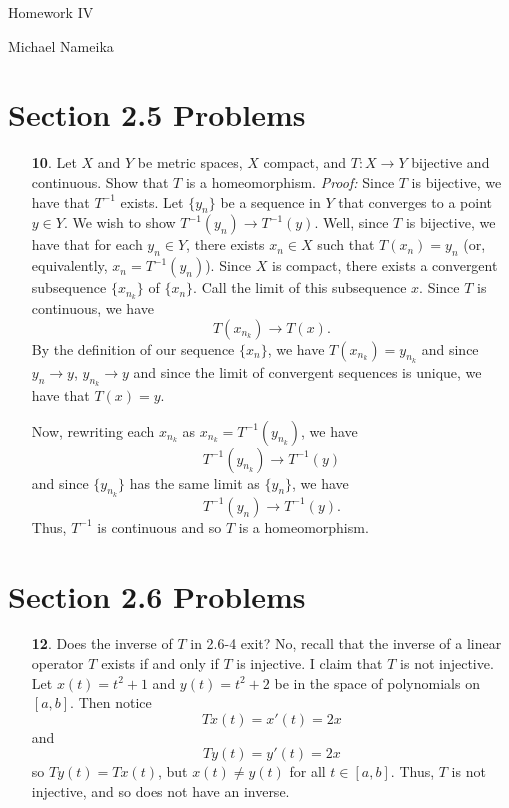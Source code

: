 \documentclass{article}
\begin{document}
\begin{center}
    {\Large Homework IV}
    \vspace{0.5 cm}

    {\large Michael Nameika}
\end{center}

\section*{Section 2.5 Problems}
\begin{itemize}
    \item[\textbf{10}.] Let $X$ and $Y$ be metric spaces, $X$ compact, and $T: X \to Y$ bijective and continuous. Show that $T$ is a homeomorphism.
    \newline\newline
    \textit{Proof:} Since $T$ is bijective, we have that $T^{-1}$ exists. Let $\{y_n\}$ be a sequence in $Y$ that converges to a point $y \in Y$. We wish to show $T^{-1}(y_n) \to T^{-1}(y)$. Well, since $T$ is bijective, we have that for each $y_n \in Y$, there exists $x_n \in X$ such that $T(x_n) = y_n$ (or, equivalently, $x_n = T^{-1}(y_n)$). Since $X$ is compact, there exists a convergent subsequence $\{x_{n_k}\}$ of $\{x_n\}$. Call the limit of this subsequence $x$. Since $T$ is continuous, we have
    \[T(x_{n_k}) \to T(x).\] 
    By the definition of our sequence $\{x_n\}$, we have $T(x_{n_k}) = y_{n_k}$ and since $y_n \to y$, $y_{n_k} \to y$ and since the limit of convergent sequences is unique, we have that $T(x) = y$. 

    Now, rewriting each $x_{n_k}$ as $x_{n_k} = T^{-1}(y_{n_k})$, we have 
    \[T^{-1}(y_{n_k}) \to T^{-1}(y)\]
    and since $\{y_{n_k}\}$ has the same limit as $\{y_n\}$, we have
    \[T^{-1}(y_n) \to T^{-1}(y).\]
    Thus, $T^{-1}$ is continuous and so $T$ is a homeomorphism.
\end{itemize}

\section*{Section 2.6 Problems}
\begin{itemize}
    \item[\textbf{12}.] Does the inverse of $T$ in 2.6-4 exit?
    \newline\newline
    No, recall that the inverse of a linear operator $T$ exists if and only if $T$ is injective. I claim that $T$ is not injective. Let $x(t) = t^2 + 1$ and $y(t) = t^2 + 2$ be in the space of polynomials on $[a,b]$. Then notice
    \[Tx(t) = x'(t) = 2x\]
    and
    \[Ty(t) = y'(t) = 2x\]
    so $Ty(t) = Tx(t)$, but $x(t) \neq y(t)$ for all $t \in [a,b]$. Thus, $T$ is not injective, and so does not have an inverse. 
\end{itemize}
\end{document}
